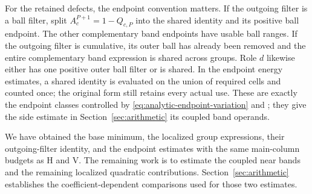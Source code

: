 For the retained defects, the endpoint convention matters.
If the outgoing filter is a ball filter, split
\(A_c^{P+1}=1-Q_{c,P}\) into the shared identity and its positive
ball endpoint.  The other complementary band endpoints have
usable ball ranges.  If the outgoing filter is cumulative,
its outer ball has already been removed and the entire
complementary band expression is shared across groups.
Role \(d\) likewise either has one positive outer ball filter
or is shared.  In the endpoint energy estimates, a shared
identity is evaluated on the union of required cells and counted
once; the original form still retains every actual use.
These are exactly the endpoint
classes controlled by \eqref{eq:analytic-endpoint-variation}
and \cite[Corollary~6.2]{V}; they give the side estimate in
Section~\ref{sec:arithmetic} its coupled band operands.

We have obtained the base minimum, the localized group expressions,
their outgoing-filter identity, and the endpoint estimates with the
same main-column budgets as H and V.  The remaining work is to
estimate the coupled near bands and the remaining localized quadratic
contributions.  Section~\ref{sec:arithmetic}
establishes the coefficient-dependent comparisons used for those
two estimates.
